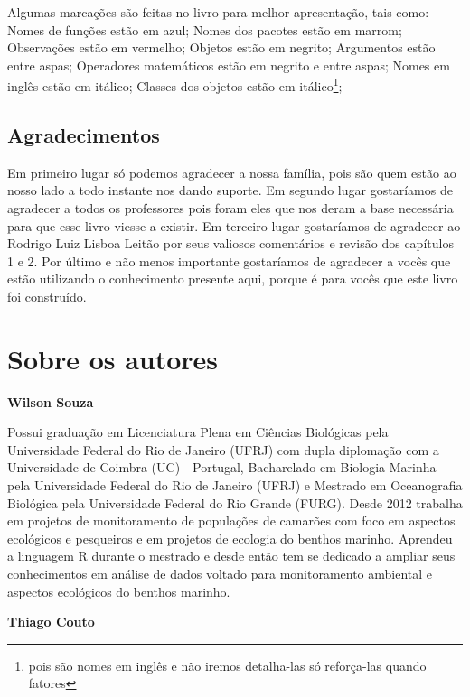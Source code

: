 \documentclass[14pt,titlepage, oneside, openany, a4paper]{book}
\begin{document}
Algumas marcações são feitas no livro para melhor apresentação, tais como: Nomes de funções estão em azul; Nomes dos pacotes estão em marrom; Observações estão em vermelho; Objetos estão em negrito; Argumentos estão entre aspas; Operadores matemáticos estão em negrito e entre aspas; Nomes em inglês estão em itálico; Classes dos objetos estão em itálico\footnote{pois são nomes em inglês e não iremos detalha-las só reforça-las quando fatores};

\hypertarget{agradecimentos}{%
\section*{Agradecimentos}\label{agradecimentos}}

Em primeiro lugar só podemos agradecer a nossa família, pois são quem estão ao nosso lado a todo instante nos dando suporte. Em segundo lugar gostaríamos de agradecer a todos os professores pois foram eles que nos deram a base necessária para que esse livro viesse a existir. Em terceiro lugar gostaríamos de agradecer ao Rodrigo Luiz Lisboa Leitão por seus valiosos comentários e revisão dos capítulos 1 e 2. Por último e não menos importante gostaríamos de agradecer a vocês que estão utilizando o conhecimento presente aqui, porque é para vocês que este livro foi construído.

\hypertarget{sobre-os-autores}{%
\chapter*{Sobre os autores}\label{sobre-os-autores}}

\textbf{Wilson Souza}

Possui graduação em Licenciatura Plena em Ciências Biológicas pela Universidade Federal do Rio de Janeiro (UFRJ) com dupla diplomação com a Universidade de Coimbra (UC) - Portugal, Bacharelado em Biologia Marinha pela Universidade Federal do Rio de Janeiro (UFRJ) e Mestrado em Oceanografia Biológica pela Universidade Federal do Rio Grande (FURG). Desde 2012 trabalha em projetos de monitoramento de populações de camarões com foco em aspectos ecológicos e pesqueiros e em projetos de ecologia do benthos marinho. Aprendeu a linguagem R durante o mestrado e desde então tem se dedicado a ampliar seus conhecimentos em análise de dados voltado para monitoramento ambiental e aspectos ecológicos do benthos marinho.

\textbf{Thiago Couto}
\end{document}
